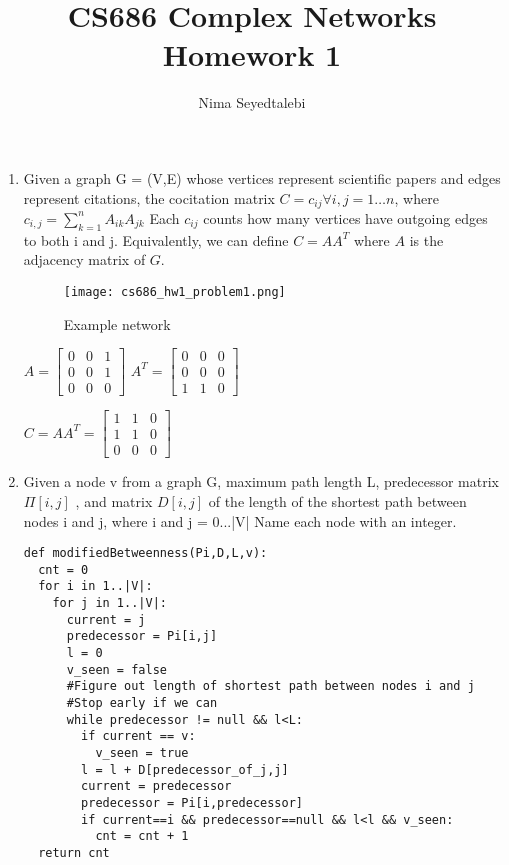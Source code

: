 \documentclass[]{article}
\title{CS686 Complex Networks Homework 1}
\author{Nima Seyedtalebi}
\begin{document}
\maketitle


\begin{enumerate}
	\item Given a graph G = (V,E) whose vertices represent scientific papers and edges represent citations, the cocitation matrix $C = c_{ij} \forall {i,j} = 1\dots n$, where $c_{i,j} = \sum_{k=1}^{n} A_{ik}A_{jk}$ Each $c_{ij}$ counts how many vertices have outgoing edges to both i and j. Equivalently, we can define $C = AA^T$ where $A$ is the adjacency matrix of $G$. 
	\begin{figure}[h!]
		\texttt{[image: cs686\_hw1\_problem1.png]}
		\caption{Example network}
		\label{fig:prob1}
	\end{figure}


	$A =  \begin{bmatrix}0&0&1\\
	0&0&1\\
	0&0&0
	\end{bmatrix}$ 	$A^T =  \begin{bmatrix}0&0&0\\
	0&0&0\\
	1&1&0
	\end{bmatrix}$
	
	$C=AA^T=\begin{bmatrix}
	1&1&0\\
	1&1&0\\
	0&0&0
	\end{bmatrix}$
	
	\item  Given a node v from a graph G, maximum path length L, predecessor matrix $\Pi[i,j]$ , and matrix $D[i,j]$ of the length of the shortest path between nodes i and j, where i and j = 0...|V|
	Name each node with an integer.
	
	\begin{verbatim}
def modifiedBetweenness(Pi,D,L,v):
  cnt = 0
  for i in 1..|V|:
    for j in 1..|V|:
      current = j
      predecessor = Pi[i,j]
      l = 0
      v_seen = false
      #Figure out length of shortest path between nodes i and j
      #Stop early if we can
      while predecessor != null && l<L:
        if current == v:
          v_seen = true
        l = l + D[predecessor_of_j,j]
        current = predecessor
        predecessor = Pi[i,predecessor]
        if current==i && predecessor==null && l<l && v_seen:
          cnt = cnt + 1
  return cnt
	

\end{verbatim}
\end{enumerate}
\end{document}

